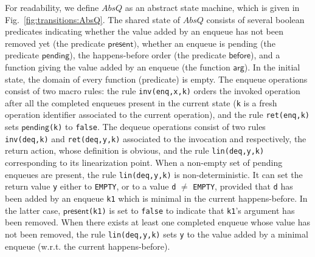 For readability, we define $AbsQ$ as an abstract state machine, which is given in Fig.~\ref{fig:transitions:AbsQ}. The shared state of $AbsQ$ consists of several boolean predicates indicating whether the value added by an enqueue has not been removed yet (the predicate $\mathsf{present})$, whether an enqueue is pending (the predicate $\mathsf{pending}$), the happens-before order (the predicate $\mathsf{before}$), and a function giving the value added by an enqueue (the function $\mathsf{arg}$). In the initial state, the domain of every function (predicate) is empty.
%
The enqueue operations consist of two macro rules: the rule {\tt inv(enq,x,k)} orders the invoked operation after all the completed enqueues present in the current state ({\tt k} is a fresh operation identifier associated to the current operation), and the rule {\tt ret(enq,k)} sets $\mathsf{pending}${\tt (k)} to {\tt false}. %
The dequeue operations consist of two rules {\tt inv(deq,k)} and {\tt ret(deq,y,k)} associated to the invocation and respectively, the return action, whose definition is obvious, and the rule {\tt lin(deq,y,k)} corresponding to its linearization point. When a non-empty set of pending enqueues are present, the rule {\tt lin(deq,y,k)} is non-deterministic. It can set the return value {\tt y} either to {\tt EMPTY}, or to a value {\tt d} $\neq$ {\tt EMPTY}, provided that {\tt d} has been added by an enqueue {\tt k1} which is minimal in the current happens-before. In the latter case, $\mathsf{present}${\tt (k1)} is set to {\tt false} to indicate that {\tt k1}'s argument has been removed. When there exists at least one completed enqueue whose value has not been removed, the rule {\tt lin(deq,y,k)} sets {\tt y} to the value added by a minimal enqueue (w.r.t. the current happens-before).

